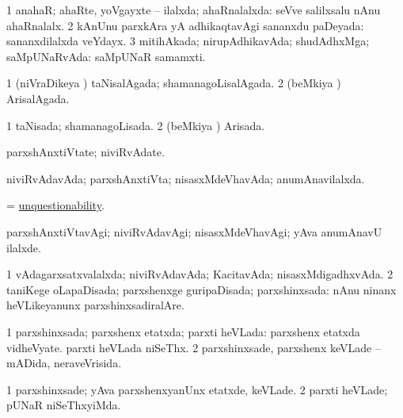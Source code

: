 \bentry
{} 
\gl{\gu}
\expl{}
\bmng
\bnum
\num{1} anahaR; ahaRte, yoVgayxte -- ilalxda; ahaRnalalxda:  seVve salilxsalu nAnu ahaRnalalx. 
\num{2} kAnUnu parxkAra yA adhikaqtavAgi sananxdu paDeyada:  sananxdilalxda veYdayx. 
\num{3} mitihAkada; nirupAdhikavAda; shudAdhxMga; saMpUNaRvAda:  saMpUNaR samamxti. 
\enum
\emng
\eentry

\bentry
{} 
\gl{\gu}
\expl{}
\bmng
\bnum
\num{1} (niVraDikeya \vi) taNisalAgada; shamanagoLisalAgada. 
\num{2} (beMkiya \vi) ArisalAgada. 
\enum
\emng
\eentry

\bentry
{} 
\gl{\gu}
\bmng
\bnum
\num{1} taNisada; shamanagoLisada. 
\num{2} (beMkiya \vi) Arisada. 
\enum
\emng
\eentry

\bentry
{} 
\gl{\nA}
\expl{}
\bmng
parxshAnxtiVtate; niviRvAdate. 
\emng
\eentry

\bentry
{} 
\gl{\gu}
\expl{}
\bmng
niviRvAdavAda; parxshAnxtiVta; nisasxMdeVhavAda; anumAnavilalxda. 
\emng
\eentry

\bentry
{} 
\gl{\nA}
\expl{}
\bmng
= \hyperlink{unquestionability}{unquestionability}. 
\emng
\eentry

\bentry
{} 
\gl{\kirxvi\ \nA}
\expl{}
\bmng
parxshAnxtiVtavAgi; niviRvAdavAgi; nisasxMdeVhavAgi; yAva anumAnavU ilalxde. 
\emng
\eentry

\bentry
{} 
\gl{\gu}
\expl{}
\bmng
\bnum
\num{1} vAdagarxsatxvalalxda; niviRvAdavAda; KacitavAda; nisasxMdigadhxvAda. 
\num{2} taniKege oLapaDisada; parxshenxge guripaDisada; parxshinxsada:  nAnu ninanx heVLikeyanunx parxshinxsadiralAre. 
\enum
\emng
\eentry

\bentry
{} 
\gl{\gu}
\expl{}
\bmng
\bnum
\num{1} parxshinxsada; parxshenx etatxda; parxti heVLada:  parxshenx etatxda vidheVyate.  parxti heVLada niSeThx. 
\num{2} parxshinxsade, parxshenx keVLade -- mADida, neraveVrisida. 
\enum
\emng
\eentry

\bentry
{} 
\gl{\kirxvi}
\expl{}
\bmng
\bnum
\num{1} parxshinxsade; yAva parxshenxyanUnx etatxde, keVLade. 
\num{2} parxti heVLade; pUNaR niSeThxyiMda. 
\enum
\emng
\eentry

